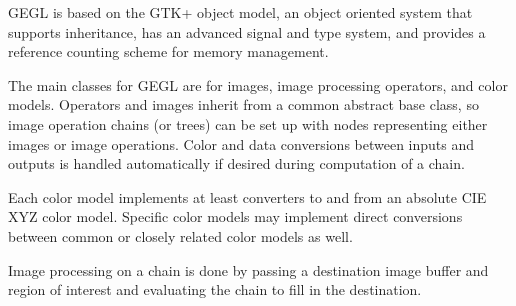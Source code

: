 GEGL is based on the GTK+ object model, an object oriented system that supports
inheritance, has an advanced signal and type system, and provides a reference
counting scheme for memory management. 

The main classes for GEGL are for images, image processing operators, and color
models. Operators and images inherit from a common abstract base class, so
image operation chains (or trees) can be set up with nodes representing either
images or image operations. Color and data conversions between inputs and
outputs is handled automatically if desired during computation of a chain. 

Each color model implements at least converters to and from an absolute CIE XYZ
color model. Specific color models may implement direct conversions between
common or closely related color models as well. 

Image processing on a chain is done by passing a destination image buffer and
region of interest and evaluating the chain to fill in the destination.  
